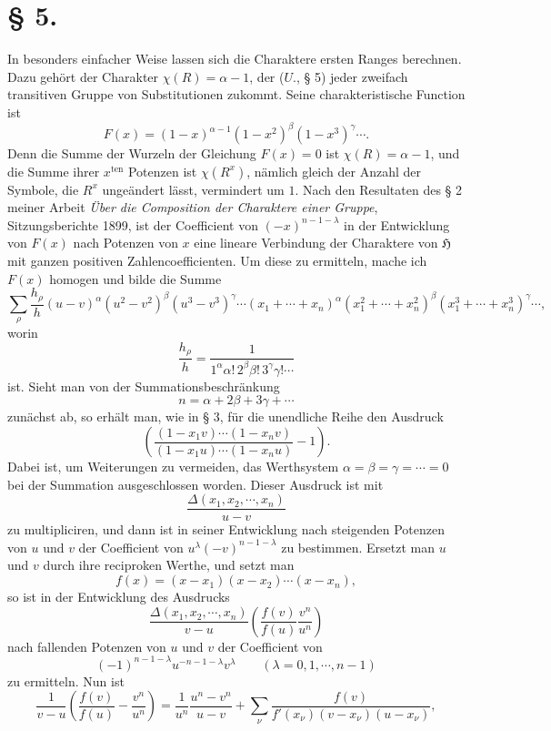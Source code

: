\documentclass[11pt]{article}
\newcommand{\Hgr}{\mathfrak{H}}
\newcommand{\ten}{\mathrm{ten}}
\begin{document}
\section*{§ 5.}

In besonders einfacher Weise lassen sich die Charaktere ersten Ranges berechnen. Dazu gehört der Charakter $\chi(R)=\alpha-1$, der ($U.$, § 5) jeder zweifach transitiven Gruppe von Substitutionen zukommt. Seine charakteristische Function ist
\begin{equation}\tag{1.}
 F(x)=(1-x)^{\alpha-1}(1-x^2)^\beta(1-x^3)^\gamma\cdots.
\end{equation}
Denn die Summe der Wurzeln der Gleichung $F(x)=0$ ist $\chi(R)=\alpha-1$, und die Summe ihrer $x^{\ten}$ Potenzen ist $\chi(R^x)$, nämlich gleich der Anzahl der Symbole, die $R^x$ ungeändert lässt, vermindert um $1$. Nach den Resultaten des § 2 meiner Arbeit \emph{Über die Composition der Charaktere einer Gruppe}, Sitzungsberichte 1899, ist der Coefficient von $(-x)^{n-1-
\lambda}$ in der Entwicklung von $F(x)$ nach Potenzen von $x$ eine lineare Verbindung der Charaktere von $\Hgr$ mit ganzen positiven Zahlencoefficienten. Um diese zu ermitteln, mache ich $F(x)$ homogen und bilde die Summe
\[
 \sum_\rho\frac{h_\rho}{h}(u-v)^\alpha(u^2-v^2)^\beta(u^3-v^3)^\gamma\cdots
 (x_1+
\cdots+x_n)^\alpha(x_1^2+
\cdots+x_n^2)^\beta(x_1^3+
\cdots+x_n^3)^\gamma\cdots,
\]
worin
\[
 \frac{h_\rho}{h}=\frac{1}{1^\alpha\alpha!\,2^\beta\beta!\,3^\gamma\gamma!\cdots}
\]
ist. Sieht man von der Summationsbeschränkung
\[
 n=\alpha+2\beta+3\gamma+
\cdots
\]
zunächst ab, so erhält man, wie in § 3, für die unendliche Reihe den Ausdruck
\[
 \left(\frac{(1-x_1v)\cdots(1-x_nv)}{(1-x_1u)\cdots(1-x_nu)}-1\right).
\]
Dabei ist, um Weiterungen zu vermeiden, das Werthsystem $\alpha=\beta=\gamma=\cdots=0$ bei der Summation ausgeschlossen worden. Dieser Ausdruck ist mit
\[
 \frac{\Delta(x_1,x_2,
\cdots,x_n)}{u-v}
\]
zu multipliciren, und dann ist in seiner Entwicklung nach steigenden Potenzen von $u$ und $v$ der Coefficient von $u^\lambda(-v)^{n-1-
\lambda}$ zu bestimmen. Ersetzt man $u$ und $v$ durch ihre reciproken Werthe, und setzt man
\[
 f(x)=(x-x_1)(x-x_2)\cdots(x-x_n),
\]
so ist in der Entwicklung des Ausdrucks
\[
 \frac{\Delta(x_1,x_2,
\cdots,x_n)}{v-u}\left(\frac{f(v)}{f(u)}\frac{v^n}{u^n}\right)
\]
nach fallenden Potenzen von $u$ und $v$ der Coefficient von
\[
 (-1)^{n-1-
\lambda}u^{-n-1-
\lambda}v^\lambda\qquad(\lambda=0,1,
\cdots,n-1)
\]
zu ermitteln. Nun ist
\[
 \frac1{v-u}\left(\frac{f(v)}{f(u)}-\frac{v^n}{u^n}\right)=\frac1{u^n}\frac{u^n-v^n}{u-v}+
 \sum_\nu\frac{f(v)}{f'(x_\nu)(v-x_\nu)(u-x_\nu)},
\]
\end{document}

